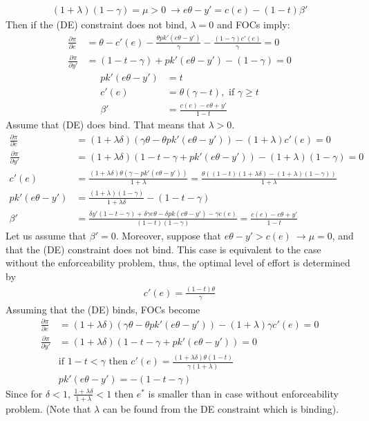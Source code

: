 \documentclass[a4paper]{article}
\begin{document}
\begin{align*}
(1 + \lambda)(1 - \gamma) = \mu > 0\ \to e \theta - y' = c(e) - (1 - t)\beta'
\end{align*}
Then if the (DE) constraint does not bind, $\lambda = 0$ and FOCs imply:
\begin{align*}
\frac{\partial \pi}{\partial e}&=\theta - c'(e)- \frac{\theta p k'(e \theta - y')}{\gamma} - \frac{(1 - \gamma)c'(e)}{\gamma}= 0\\
\frac{\partial \pi}{\partial y'} &= (1 - t - \gamma)+pk'(e\theta - y') - (1-\gamma) = 0
\end{align*}
\begin{align*}
pk'(e\theta - y') &= t\\
c'(e) &= \theta(\gamma - t), \text{ if }\gamma \ge t\\
\beta' &= \frac{c(e) - e \theta + y'}{1-t}
\end{align*}
Assume that (DE) does bind. That means that $\lambda > 0$.
\begin{align*}
\frac{\partial \pi}{\partial e} &= (1 + \lambda \delta)(\gamma \theta - \theta p k'(e \theta - y')) - (1+\lambda)c'(e) = 0\\
\frac{\partial \pi}{\partial y'} &= (1+\lambda \delta)(1 - t - \gamma+pk'(e\theta - y')) - (1+\lambda)(1-\gamma) = 0\\
c'(e) &= \frac{(1+\lambda \delta)\theta(\gamma - pk'(e \theta - y'))}{1+\lambda} = \frac{\theta((1-t)(1 + \lambda \delta) - (1+\lambda)(1 - \gamma))}{1+\lambda}\\
pk'(e\theta - y') &= \frac{(1+\lambda)(1-\gamma)}{1+\lambda \delta} - (1 - t - \gamma)\\
\beta' &= \frac{\delta y'(1 - t - \gamma) + \delta \gamma e \theta - \delta p k(e \theta - y') - \gamma c(e)}{(1-t)(1-\gamma)} = \frac{c(e) - e \theta + y'}{1-t}
\end{align*}
Let us assume that $\beta' = 0$. Moreover, suppose that $e \theta - y' > c(e)\ \to \mu = 0$, and that the (DE) constraint does not bind. This case is equivalent to the case without the enforceability problem, thus, the optimal level of effort is determined by
\begin{align*}
c'(e) = \frac{(1 - t)\theta}{\gamma}
\end{align*}
Assuming that the (DE) binds, FOCs become
\begin{align*}
\frac{\partial \pi}{\partial e} &= (1 + \lambda \delta)(\gamma \theta - \theta p k'(e \theta - y')) -(1+ \lambda) \gamma c'(e)= 0\\
\frac{\partial \pi}{\partial y'} &= (1 + \lambda \delta)(1 - t - \gamma+pk'(e\theta - y')) = 0\\
&\text{if }1-t < \gamma \text{ then }c'(e) = \frac{(1+\lambda \delta)\theta(1-t)}{\gamma (1 + \lambda)}\\
&pk'(e \theta - y') = -(1 - t - \gamma)
\end{align*}
Since for $\delta < 1$, $\frac{1+\lambda \delta}{1+\lambda} < 1$ then $e^*$ is smaller than in case without enforceability problem. (Note that $\lambda$ can be found from the DE constraint which is binding). 
\end{document}
